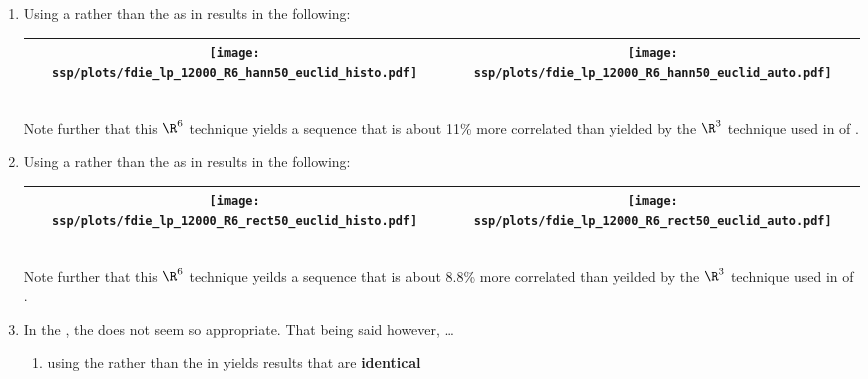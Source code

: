 \begin{example}
\begin{enumerate}
  \item \label{item:fdie_lp_R6_hann50_euclid}
        Using a  rather than the 
         as in 
        results in the following: %
     \\\begin{tabular}{|>{\scs}c|>{\scs}c|}
          \hline
          \texttt{[image: ssp/plots/fdie\_lp\_12000\_R6\_hann50\_euclid\_histo.pdf]}%
         &\texttt{[image: ssp/plots/fdie\_lp\_12000\_R6\_hann50\_euclid\_auto.pdf]}
        \\\hline
     \end{tabular}\\
     Note further that this $\R^6$ technique yields a sequence that is about 11\% more correlated than 
     yielded by the $\R^3$ technique
     used in  of .

  \item \label{item:fdie_lp_R6_rect50_euclid}
        Using a  rather than the 
         as in 
        results in the following: %
     \\\begin{tabular}{|>{\scs}c|>{\scs}c|}
          \hline
          \texttt{[image: ssp/plots/fdie\_lp\_12000\_R6\_rect50\_euclid\_histo.pdf]}%
         &\texttt{[image: ssp/plots/fdie\_lp\_12000\_R6\_rect50\_euclid\_auto.pdf]}
        \\\hline
     \end{tabular}\\
     Note further that this $\R^6$ technique yeilds a sequence that is about 8.8\% more correlated than yeilded by the $\R^3$ technique
     used in  of .

  \item In the , the  does not seem so appropriate.
        That being said however, \ldots 
    \begin{enumerate}
      \item using the  rather than the  in 
             yields results that are 
            \textbf{identical} %


\end{enumerate}
\end{enumerate}
\end{example}

